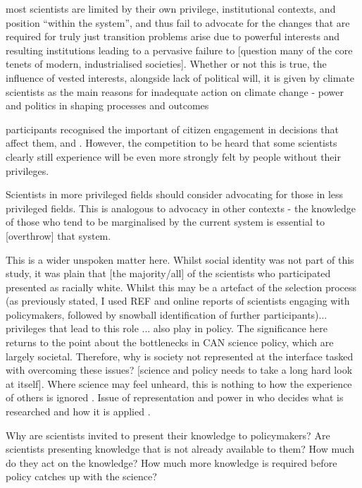 \cite{Bendell2024} most scientists are limited by their own privilege, institutional contexts, and position ``within the system'', and thus fail to advocate for the changes that are required for truly just transition  
\cite{StoddardEtAl2021} problems arise due to powerful interests and resulting institutions leading to a pervasive failure to [question many of the core tenets of modern, industrialised societies]. Whether or not this is true, the influence of vested interests, alongside lack of political will, it is given by climate scientists as the main reasons for inadequate action on climate change \cite{Carrington2024} 
\cite{TurnhoutMWKL2020} - power and politics in shaping processes and outcomes

participants recognised the important of citizen engagement in decisions that affect them, and . However, the competition to be heard that some scientists clearly still experience will be even more strongly felt by people without their privileges.

Scientists in more privileged fields should consider advocating for those in less privileged fields. This is analogous to advocacy in other contexts - the knowledge of those who tend to be marginalised by the current system is essential to [overthrow] that system.

This is a wider unspoken matter here. Whilst social identity was not part of this study, it was plain that [the majority/all] of the scientists who participated presented as racially white. Whilst this may be a artefact of the selection process (as previously stated, I used REF and online reports of scientists engaging with policymakers, followed by snowball identification of further participants)... privileges that lead to this role ... also play in policy. The significance here returns to the point about the bottlenecks in CAN science policy, which are largely societal. Therefore, why is society not represented at the interface tasked with overcoming these issues? [science and policy needs to take a long hard look at itself]. Where science may feel unheard, this is nothing to how the experience of others is ignored \cite{IbarraJOBCIMRS2022}. Issue of representation and power in who decides what is researched and how it is applied \cite{McNiePS2017}.

Why are scientists invited to present their knowledge to policymakers? Are scientists presenting knowledge that is not already available to them? How much do they act on the knowledge? How much more knowledge is required before policy catches up with the science?


